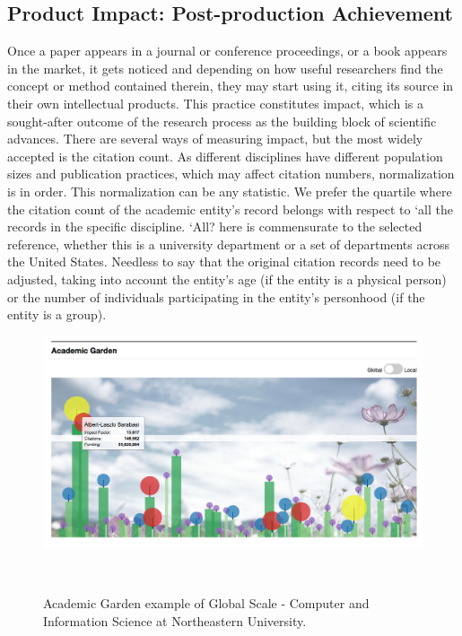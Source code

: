 \subsection {Product Impact: Post-production Achievement}
Once a paper appears in a journal or conference proceedings, or a book appears in the market, it gets noticed and depending on how useful researchers find the concept or method contained therein, they may start using it, citing its source in their own intellectual products. This practice constitutes impact, which is a sought-after outcome of the research process as the building block of scientific advances. There are several ways of measuring impact, but the most widely accepted is the citation count.
As different disciplines have different population sizes and publication practices, which may affect citation numbers, normalization is in order. This normalization can be any statistic. We prefer the quartile where the citation count of the academic entity's record belongs with respect to `all the records in the specific discipline.  `All? here is commensurate to the selected reference, whether this is a university department or a set of departments across the United States. Needless to say that the original citation records need to be adjusted, taking into account the entity's age (if the entity is a physical person) or the number of individuals participating in the entity's personhood (if the entity is a group).


\begin{figure}
    \centering
    \includegraphics[width=1\textwidth]{figures/fig-AG-global.png}
    \caption{Academic Garden example of Global Scale - Computer and Information Science at Northeastern University.}~\label{fig-AG-global}
\end{figure}


